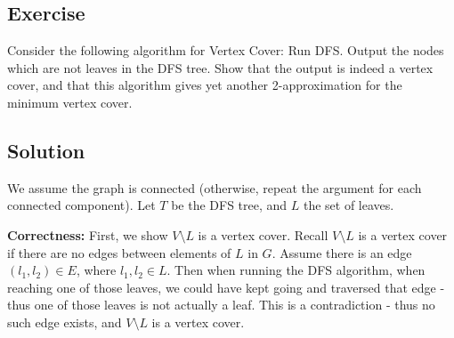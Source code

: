 \documentclass{article}
\newcounter{counter}
\newcommand{\Exercise}{Exercise \stepcounter{counter}\thecounter}
\begin{document}
\begin{enumerate}
    \end{enumerate}

\subsection*{\Exercise}
    Consider the following algorithm for Vertex Cover: Run DFS. Output the nodes which are not leaves in the DFS tree. Show that the output is indeed a vertex cover, and that this algorithm gives yet another 2-approximation for the minimum vertex cover.

\subsection*{Solution}
    We assume the graph is connected (otherwise, repeat the argument for each connected component). Let $T$ be the DFS tree, and $L$ the set of leaves.

    \vspace{3mm}
    \textbf{Correctness:} First, we show $V \setminus L$ is a vertex cover. Recall $V \setminus L$ is a vertex cover if there are no edges between elements of $L$ in $G$. Assume there is an edge $(l_1, l_2) \in E$, where $l_1, l_2 \in L$. Then when running the DFS algorithm, when reaching one of those leaves, we could have kept going and traversed that edge - thus one of those leaves is not actually a  leaf. This is a contradiction - thus no such edge exists, and $V \setminus L$ is a vertex cover.
    
\end{document}
